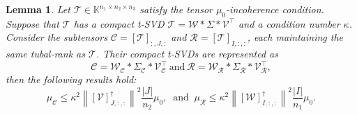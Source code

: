 \documentclass[twoside,12pt]{article}
\newtheorem{lemma}{Lemma}
\begin{document}
\begin{lemma}\label{lmm:c_incoherence1} 
Let $\mathcal{T} \in \mathbb{K}^{n_1 \times n_2 \times n_3}$ satisfy the tensor $\mu_0$-incoherence condition. Suppose that $\mathcal{T}$ has a compact t-SVD $\mathcal{T}=\mathcal{W}\ast\Sigma \ast\mathcal{V}^{\top}$ and a condition number $\kappa$.  Consider the subtensors $\mathcal{C}=[\mathcal{T}]_{:,J,:}$ and $\mathcal{R}=[\mathcal{T}]_{I,:,:}$, each maintaining the same tubal-rank as  $\mathcal{T}$. Their compact t-SVDs are represented as \[\mathcal{C}=\mathcal{W}_{\mathcal{C}}*\Sigma_{\mathcal{C}}*\mathcal{V}_{\mathcal{C}}^{\top} ~\text{and}~ \mathcal{R}=\mathcal{W}_{\mathcal{R}}*\Sigma_{\mathcal{R}}*\mathcal{V}_{\mathcal{R}}^{\top},\] then the following results hold:
\[\mu_{\mathcal{C}}\leq \kappa^2 \left\|[\mathcal{V}]_{J,:,:}^{\dagger}\right\|^2\frac{|J|}{n_2}\mu_0,~ \text{ and } ~\mu_{\mathcal{R}}\leq \kappa^2 \left\|[\mathcal{W}]_{I,:,:}^{\dagger}\right\|^2\frac{|I|}{n_1}\mu_0.\]
 \end{lemma}
\end{document}
